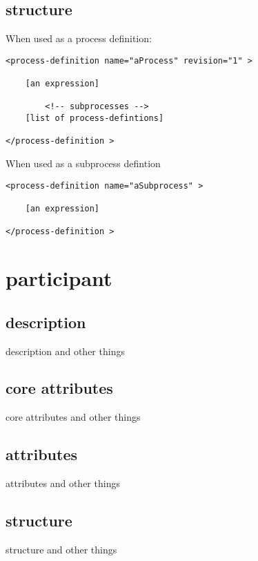    \subsection{structure}

When used as a process definition:
\begin{verbatim}
<process-definition name="aProcess" revision="1" >

    [an expression]

        <!-- subprocesses -->
    [list of process-defintions]

</process-definition >
\end{verbatim}

When used as a subprocess defintion
\begin{verbatim}
<process-definition name="aSubprocess" >

    [an expression]

</process-definition >
\end{verbatim}

\newpage




\section{participant}

    \subsection{description}

description and other things

    \subsection{core attributes}

core attributes and other things

    \subsection{attributes}

attributes and other things

    \subsection{structure}

structure and other things




